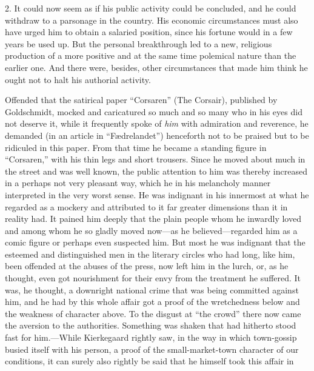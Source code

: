 \documentclass[12pt,a4paper]{book}
\newcommand{\opage}[1]{\marginnote{\footnotesize\textit{[#1]}}}
\begin{document}
2. It could now seem as if his public activity could be concluded, and
he could withdraw to a parsonage in the country. His economic
circumstances must also have urged him to obtain a salaried
\opage{130}position, since his fortune would in a few years be used up.
But the personal breakthrough led to a new, religious production of a
more positive and at the same time polemical nature than the earlier
one. And there were, besides, other circumstances that made him think
he ought not to halt his authorial activity.

Offended that the satirical paper ``Corsaren'' (The Corsair), published
by Goldschmidt, mocked and caricatured so much and so many who in his
eyes did not deserve it, while it frequently spoke of \textit{him} with
admiration and reverence, he demanded (in an article in
``Fædrelandet'') henceforth not to be praised but to be ridiculed in
this paper. From that time he became a standing figure in ``Corsaren,''
with his thin legs and short trousers. Since he moved about much in the
street and was well known, the public attention to him was thereby
increased in a perhaps not very pleasant way, which he in his melancholy
manner interpreted in the very worst sense. He was indignant in his
innermost at what he regarded as a mockery and attributed to it far
greater dimensions than it in reality had. It pained him deeply that
the plain people whom he inwardly loved and among whom he so gladly
moved now---as he believed---regarded him as a comic figure or perhaps
even suspected him. But most he was indignant that the esteemed and
distinguished men in the literary circles who had long, like him, been
offended at the abuses of the press, now left him in the lurch, or, as
he thought, even got nourishment for their envy from the treatment he
suffered. It was, he thought, a downright national crime that was being
committed against him, and he had by this whole affair got a proof of
the wretchedness below and the weakness of character above. To the
disgust at ``the crowd'' there now came the aversion to the
authorities. Something was shaken
\opage{131}that had hitherto stood fast for him.---While Kierkegaard
rightly saw, in the way in which town-gossip busied itself with his
person, a proof of the small-market-town character of our conditions,
it can surely also rightly be said that he himself took this affair in
\end{document}
